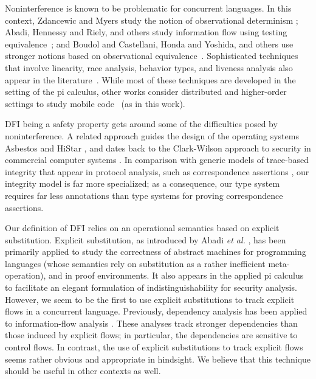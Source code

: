 \documentclass{sigplanconf}
\begin{document}
Noninterference is known to be problematic for concurrent languages. In this context, Zdancewic and Myers study the notion of observational determinism \cite{obsdetconc}; Abadi, Hennessy and Riely, and others study information flow using testing equivalence~\cite{abadi99secrecy,inflowresacc}; and Boudol and Castellani, Honda and Yoshida, and others use stronger notions based on observational equivalence~\cite{boudolcastellani,linearpi}. So\-phisticated techniques that involve linearity, race analysis, behavior types, and liveness analysis also appear in the literature~\cite{linearpi,obsdetconc,inflowresacc,kobayashi05}. While most of these techniques are developed in the setting of the pi calculus, other works consider distributed and higher-order settings to study mobile code~\cite{safedpi,depHOMP,envbisim} (as in this work).

DFI being a safety property \cite{alpernschneider} gets around some of the difficulties posed by noninterference. A related approach guides the design of the operating systems  Asbestos \cite{asbestos} and HiStar \cite{histar}, and dates back to the Clark-Wilson approach to security in commercial computer systems \cite{clark-wilson,shankar}. In comparison with generic models of trace-based integrity that appear in protocol analysis, such as correspondence assertions \cite{typecorr,fournetGM05}, our integrity model is far more specialized; as a consequence, our type system requires far less annotations than type systems for proving correspondence assertions. 

Our definition of
DFI relies on an operational semantics based on
explicit substitution. Explicit substitution, as introduced by Abadi \emph{et al.} \cite{abadi90explicit}, has been primarily applied to study the
correctness of abstract machines for programming languages (whose semantics rely on substitution as a rather inefficient
meta-operation), and in proof environments. It also appears in the applied pi
calculus \cite{appliedpi} to facilitate an elegant formulation of
indistinguishability for security analysis. However, we seem to be
the first to use explicit substitutions to track explicit flows in
a concurrent language. 
Previously, dependency analysis
\cite{levylabels,cachedep} has been applied to information-flow analysis
\cite{dcc,pottier00information,ZM02}. These analyses track stronger dependencies than those induced by explicit flows; in particular, the dependencies are sensitive to control flows. In contrast, the use of explicit substitutions to track explicit flows seems rather obvious and appropriate in hindsight. We believe that this technique should be useful in other contexts as well. 
\end{document}

